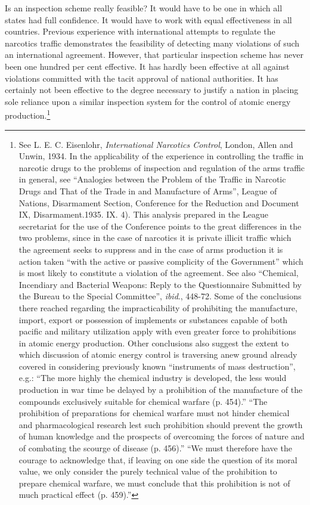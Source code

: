 Is an inspection scheme really feasible? It would have to be one in which all states had full confidence. It would have to work with equal effectiveness in all countries. Previous experience with international attempts to regulate the narcotics traffic demonstrates the feasibility of detecting many violations of such an international agreement. However, that particular inspection scheme has never been one hundred per cent effective. It has hardly been effective at all against violations committed with the tacit approval of national authorities. It has certainly not been effective to the degree necessary to justify a nation in placing sole reliance upon a similar inspection system for the control of atomic energy production.\footnote{See L. E. C. Eisenlohr, \textit{International Narcotics Control}, London, Allen and Unwin, 1934. In the applicability of the experience in controlling the traffic in narcotic drugs to the problems of inspection and regulation of the arms traffic in general, see ``Analogies between the Problem of the Traffic in Narcotic Drugs and That of the Trade in and Manufacture of Arms'', League of Nations, Disarmament Section, Conference for the Reduction and Document IX, Disarmament.1935. IX. 4). This analysis prepared in the League secretariat for the use of the Conference points to the great differences in the two problems, since in the case of narcotics it is private illicit traffic which the agreement seeks to suppress and in the case of arms production it is action taken ``with the active or passive complicity of the Government'' which is most likely to constitute a violation of the agreement. See also ``Chemical, Incendiary and Bacterial Weapons: Reply to the Questionnaire Submitted by the Bureau to the Special Committee'', \textit{ibid}., 448-72. Some of the conclusions there reached regarding the impracticability of prohibiting the manufacture, import, export or possession of implements or substances capable of both pacific and military utilization apply with even greater force to prohibitions in atomic energy production. Other conclusions also suggest the extent to which discussion of atomic energy control is traversing anew ground already covered in considering previously known ``instruments of mass destruction'', e.g.: ``The more highly the chemical industry is developed, the less would production in war time be delayed by a prohibition of the manufacture of the compounds exclusively suitable for chemical warfare (p. 454).'' ``The prohibition of preparations for chemical warfare must not hinder chemical and pharmacological research lest such prohibition should prevent the growth of human knowledge and the prospects of overcoming the forces of nature and of combating the scourge of disease (p. 456).'' ``We must therefore have the courage to acknowledge that, if leaving on one side the question of its moral value, we only consider the purely technical value of the prohibition to prepare chemical warfare, we must conclude that this prohibition is not of much practical effect (p. 459).''}

